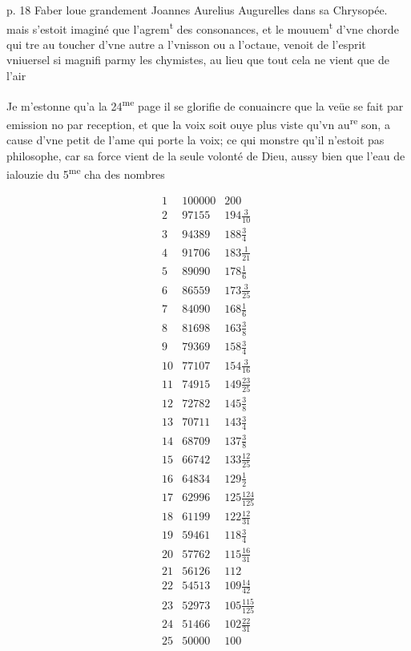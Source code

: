 \documentclass[11pt,a4paper]{article}
\begin{document}
p. 18 Faber loue grandement Joannes Aurelius Augurelles dans sa Chrysopée. mais s'estoit imaginé que l'agrem\textsuperscript{t} des consonances, et le mouuem\textsuperscript{t} d'vne chorde qui tre\ill{} au toucher d'vne autre a l'vnisson ou a l'octaue, venoit de l'esprit vniuersel si magnifi\ill{} parmy les chymistes, au lieu que tout cela ne vient que de l'air

Je m'estonne qu'a la 24\textsuperscript{me} page il se glorifie de conuaincre que la veüe se fait par emission no par reception, et que la voix soit ouye plus viste qu'vn au\textsuperscript{re} son, a cause d'vne petit\ill{} de l'ame qui porte la voix; ce qui monstre qu'il n'estoit pas philosophe, car sa force \ill{} vient de la seule volonté de Dieu, aussy bien que l'eau de ialouzie du 5\textsuperscript{me} cha\ill{} des nombres

\[
\begin{array}{r|l|l}
1 & 100000 & 200 \\
2 & 97155 & 194\frac{3}{10} \\
3 & 94389 & 188\frac{3}{4} \\
4 & 91706 & 183\frac{1}{21} \\
5 & 89090 & 178\frac{1}{6} \\
6 & 86559 & 173\frac{3}{25} \\
7 & 84090 & 168\frac{1}{6} \\
8 & 81698 & 163\frac{3}{8} \\
9 & 79369 & 158\frac{3}{4} \\
10 & 77107 & 154\frac{3}{16} \\
11 & 74915 & 149\frac{23}{25} \\
12 & 72782 & 145\frac{3}{8} \\
13 & 70711 & 143\frac{3}{4} \\
14 & 68709 & 137\frac{3}{8} \\
15 & 66742 & 133\frac{12}{25} \\
16 & 64834 & 129\frac{1}{2} \\
17 & 62996 & 125\frac{124}{125} \\
18 & 61199 & 122\frac{12}{31} \\
19 & 59461 & 118\frac{3}{4} \\
20 & 57762 & 115\frac{16}{31} \\
21 & 56126 & 112 \\
22 & 54513 & 109\frac{14}{42} \\
23 & 52973 & 105\frac{115}{125} \\
24 & 51466 & 102\frac{22}{31} \\
25 & 50000 & 100
\end{array}
\]
\end{document}
